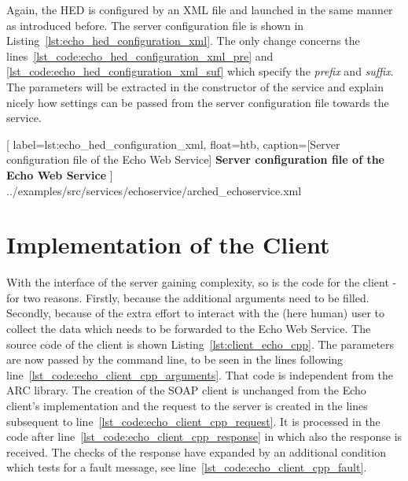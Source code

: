 Again, the HED is configured by an XML file and launched in the same manner as introduced before.
The server configuration file is shown in Listing~\ref{lst:echo_hed_configuration_xml}.
The only change concerns the lines~\ref{lst_code:echo_hed_configuration_xml_pre} and \ref{lst_code:echo_hed_configuration_xml_suf} which specify the \textit{prefix} and \textit{suffix}.
The parameters will be extracted in the constructor of the service and explain nicely how settings can be passed from the server configuration file towards the service.


	[
	label=lst:echo_hed_configuration_xml, float=htb,
	caption={[Server configuration file of the Echo Web Service]
	\textbf{Server configuration file of the Echo Web Service}}
	]
{../examples/src/services/echoservice/arched_echoservice.xml}








\section{Implementation of the Client}

With the interface of the server gaining complexity, so is the code for the client - for two reasons. Firstly, because the additional arguments need to be filled. Secondly, because of the extra effort to interact with the (here human) user to collect the data which needs to be forwarded to the Echo Web Service. The source code of the client is shown Listing~\ref{lst:client_echo_cpp}.
The parameters are now passed by the command line, to be seen in the lines following line~\ref{lst_code:echo_client_cpp_arguments}.
That code is independent from the ARC library.
The creation of the SOAP client is unchanged from the Echo client's implementation and the request to the server is created in the lines subsequent to line~\ref{lst_code:echo_client_cpp_request}.
It is processed in the code after line~\ref{lst_code:echo_client_cpp_response} in which also the response is received.
The checks of the response have expanded by an additional condition which tests for a fault message, see line~\ref{lst_code:echo_client_cpp_fault}.

